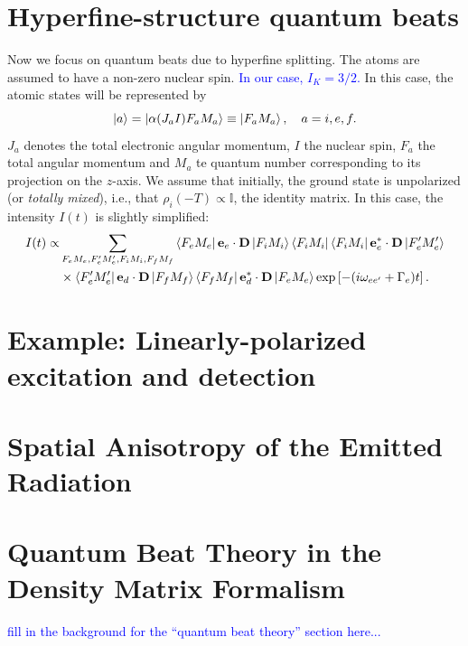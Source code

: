 \documentclass[11pt]{article}
\newcommand{\al}{\alpha}
\newcommand{\lb}{\left[}
\newcommand{\rb}{\right]}
\begin{document}
\section{Hyperfine-structure quantum beats}
Now we focus on quantum beats due to hyperfine splitting. The atoms are assumed to have a non-zero nuclear spin. \textcolor{blue}{In our case, $I_K = 3/2$.} In this case, the atomic states will be represented by 
\begin{equation}
\ket{a} = \ket{\al(J_a I) F_a M_a} \equiv \ket{F_a M_a}, \quad a = i,e,f.
\end{equation}
$J_a$ denotes the total electronic angular momentum, $I$ the nuclear spin, $F_a$ the total angular momentum and $M_a$ te quantum number corresponding to its projection on the $z$-axis. We assume that initially, the ground state is unpolarized (or \textit{totally mixed}), i.e., that $\rho_i(-T) \propto \mathbb{I}$, the identity matrix. In this case, the intensity $I(t)$ is slightly simplified:
\begin{align}
I(t) \propto &\sum_{F_eM_e,F'_eM'_e,F_iM_i,F_fM_f} \bra{F_eM_e} \mathbf{e}_e \cdot \mathbf{D} \ket{F_iM_i} \bra{F_iM_i}  \bra{F_i M_i} \mathbf{e}_e^* \cdot \mathbf{D} \ket{F'_eM'_e} \nonumber \\
&\times \bra{F'_eM'_e}\mathbf{e}_d \cdot \mathbf{D} \ket{F_fM_f}\bra{F_fM_f}\mathbf{e}_d^* \cdot \mathbf{D} \ket{F_eM_e} \exp\lb -(i\omega_{ee'} + \Gamma_e) t \rb.
\end{align}

\section{Example: Linearly-polarized excitation and detection}



\section{Spatial Anisotropy of the Emitted Radiation}



\appendix

\section{Quantum Beat Theory in the Density Matrix Formalism \cite{haroche}}\label{app:quantum_beats}

\textcolor{blue}{fill in the background for the ``quantum beat theory'' section here...}
\end{document}
